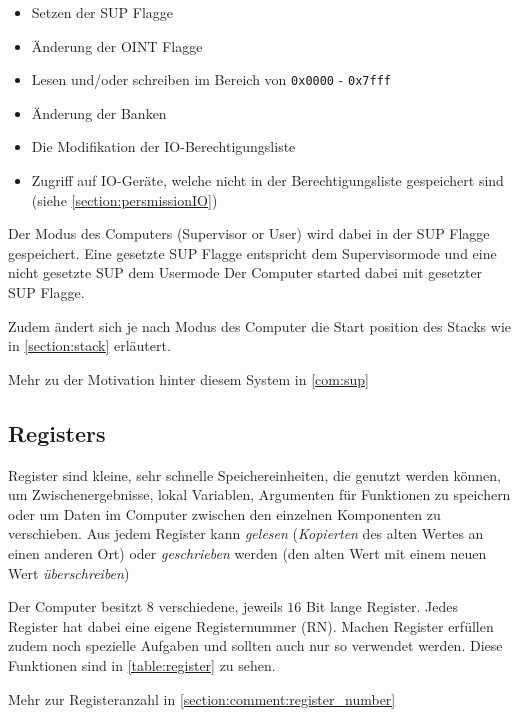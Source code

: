 \documentclass{scrartcl}
\begin{document}
\begin{itemize}
	\item Setzen der SUP Flagge
	\item Änderung der OINT Flagge
	\item Lesen und/oder schreiben im Bereich von \texttt{0x0000} - \texttt{0x7fff}
	\item Änderung der Banken
	\item Die Modifikation der IO-Berechtigungsliste
	\item Zugriff auf IO-Geräte, welche nicht in der Berechtigungsliste gespeichert sind (siehe \autoref{section:persmissionIO})
\end{itemize}

Der Modus des Computers (Supervisor or User) wird dabei in der SUP Flagge gespeichert.
Eine gesetzte SUP Flagge entspricht dem Supervisormode und eine nicht gesetzte SUP dem Usermode Der Computer started dabei mit gesetzter SUP Flagge.

Zudem ändert sich je nach Modus des Computer die Start position des Stacks wie in \autoref{section:stack} erläutert.

Mehr zu der Motivation hinter diesem System in \autoref{com:sup}



\subsection{Registers}
Register sind kleine, sehr schnelle Speichereinheiten, die genutzt werden können, um Zwischenergebnisse, lokal Variablen, Argumenten für Funktionen zu speichern oder um Daten im Computer zwischen den einzelnen Komponenten zu verschieben.
Aus jedem Register kann \emph{gelesen} (\emph{Kopierten} des alten Wertes an einen anderen Ort) oder \emph{geschrieben} werden (den alten Wert mit einem neuen Wert \emph{überschreiben})

Der Computer besitzt $8$ verschiedene, jeweils $16$ Bit lange Register.
Jedes Register hat dabei eine eigene Registernummer (RN).
Machen Register erfüllen zudem noch spezielle Aufgaben und sollten auch nur so verwendet werden.
Diese Funktionen sind in \autoref{table:register} zu sehen.

Mehr zur Registeranzahl in \autoref{section:comment:register_number}
\end{document}
